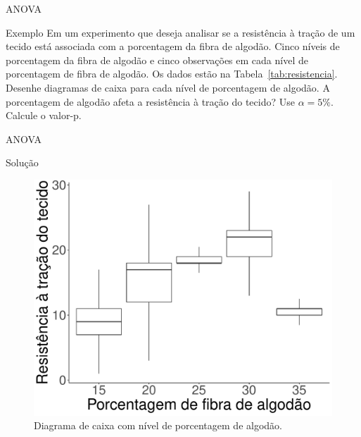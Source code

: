 \documentclass[8pt]{beamer}
\begin{document}
\begin{frame}{ANOVA}

\begin{block}{Exemplo}
	Em um experimento que deseja analisar se a resistência à tração de um tecido está associada com a porcentagem da fibra de algodão. Cinco níveis de porcentagem da fibra de algodão e cinco observações em cada nível de porcentagem de fibra de algodão. Os dados estão na Tabela~\ref{tab:resistencia}. Desenhe diagramas de caixa para cada nível de porcentagem de algodão. A porcentagem de algodão afeta a resistência à tração do tecido? Use $\alpha = 5\%$. Calcule o valor-p.
	\begin{table}[ht]
		\centering
		\caption{Resistência à tração} 
		\label{tab:resistencia}
	\end{table}
\end{block}

\end{frame}

\begin{frame}{ANOVA}

\begin{block}{Solução}
	\begin{figure}[htbp]
		\centering
		\includegraphics[width=0.65\linewidth]{figure/boxplot-ex1.pdf}
		\caption{Diagrama de caixa com nível de porcentagem de algodão.}
	\end{figure}
\end{block}

\end{frame}
\end{document}
